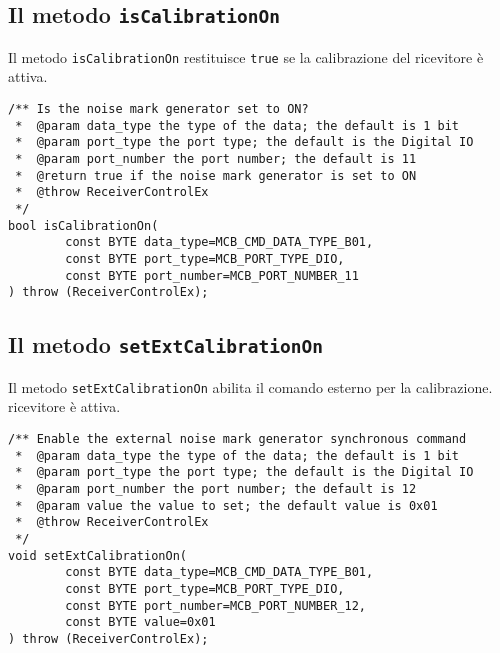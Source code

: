 \subsection{Il metodo \texttt{isCalibrationOn}}
Il metodo \texttt{isCalibrationOn} restituisce \texttt{true} se la calibrazione del 
ricevitore \`e attiva.
\lstset{language=C++}
\begin{lstlisting}[caption={Dichiarazione del metodo \texttt{isCalibrationOn}},
label=lst:isCalibrationOn,mathescape]
/** Is the noise mark generator set to ON?
 *  @param data_type the type of the data; the default is 1 bit
 *  @param port_type the port type; the default is the Digital IO
 *  @param port_number the port number; the default is 11
 *  @return true if the noise mark generator is set to ON
 *  @throw ReceiverControlEx
 */
bool isCalibrationOn(
        const BYTE data_type=MCB_CMD_DATA_TYPE_B01, 
        const BYTE port_type=MCB_PORT_TYPE_DIO, 
        const BYTE port_number=MCB_PORT_NUMBER_11
) throw (ReceiverControlEx);
\end{lstlisting}
\lstset{numbers=none}


\subsection{Il metodo \texttt{setExtCalibrationOn}}
Il metodo \texttt{setExtCalibrationOn} abilita il comando esterno per la calibrazione.
ricevitore \`e attiva.
\lstset{language=C++}
\begin{lstlisting}[caption={Dichiarazione del metodo \texttt{setExtCalibrationOn}},
label=lst:setExtCalibrationOn,mathescape]
/** Enable the external noise mark generator synchronous command
 *  @param data_type the type of the data; the default is 1 bit
 *  @param port_type the port type; the default is the Digital IO
 *  @param port_number the port number; the default is 12
 *  @param value the value to set; the default value is 0x01
 *  @throw ReceiverControlEx
 */
void setExtCalibrationOn(
        const BYTE data_type=MCB_CMD_DATA_TYPE_B01, 
        const BYTE port_type=MCB_PORT_TYPE_DIO, 
        const BYTE port_number=MCB_PORT_NUMBER_12, 
        const BYTE value=0x01
) throw (ReceiverControlEx);
\end{lstlisting}
\lstset{numbers=none}


